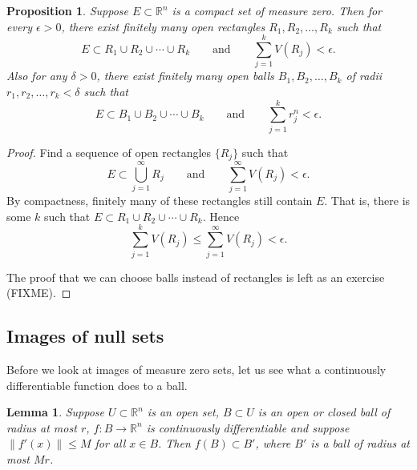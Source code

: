 \documentclass[12pt]{book}
\newcommand{\snorm}[1]{\lVert {#1} \rVert}
\newcommand{\R}{{\mathbb{R}}}
\theoremstyle{plain}
\newtheorem{lemma}[thm]{Lemma}
\newtheorem{prop}[thm]{Proposition}
\theoremstyle{remark}
\theoremstyle{definition}
\theoremstyle{exercise}
\theoremstyle{example}
\begin{document}
\begin{prop} \label{mv:prop:compactnull}
Suppose $E \subset \R^n$ is a compact set of measure zero.  Then for
every $\epsilon > 0$, there exist
finitely many open rectangles $R_1,R_2,\ldots,R_k$ such that
\begin{equation*}
E \subset R_1 \cup R_2 \cup \cdots \cup R_k
\qquad \text{and} \qquad
\sum_{j=1}^k V(R_j) < \epsilon.
\end{equation*}
Also for any $\delta > 0$,
there exist finitely many open balls $B_1,B_2,\ldots,B_k$ of radii
$r_1,r_2,\ldots,r_k < \delta$ such that
\begin{equation*}
E \subset B_1 \cup B_2 \cup \cdots \cup B_k
\qquad \text{and} \qquad
\sum_{j=1}^k r_j^n < \epsilon.
\end{equation*}
\end{prop}

\begin{proof}
Find a sequence of open rectangles $\{ R_j \}$ such that 
\begin{equation*}
E \subset \bigcup_{j=1}^\infty R_j
\qquad \text{and} \qquad
\sum_{j=1}^\infty V(R_j) < \epsilon.
\end{equation*}
By compactness, finitely
many of these rectangles still contain $E$.  That is, there is some $k$ such
that
$E \subset R_1 \cup R_2 \cup \cdots \cup R_k$.  Hence
\begin{equation*}
\sum_{j=1}^k V(R_j) \leq
\sum_{j=1}^\infty V(R_j) < \epsilon.
\end{equation*}

The proof that we can choose balls instead of rectangles is left as an
exercise (FIXME).
\end{proof}

\subsection{Images of null sets}

Before we look at images of measure zero sets, let us see what a
continuously differentiable function does to a ball.

\begin{lemma} \label{lemma:ballmapder}
Suppose $U \subset \R^n$ is an open set,
$B \subset U$ is an open or closed ball of radius at most $r$, $f \colon B \to \R^n$ is continuously
differentiable and suppose $\snorm{f'(x)} \leq M$ for all $x \in B$.
Then $f(B) \subset B'$, where $B'$ is a ball of radius at most $Mr$.
\end{lemma}
\end{document}
